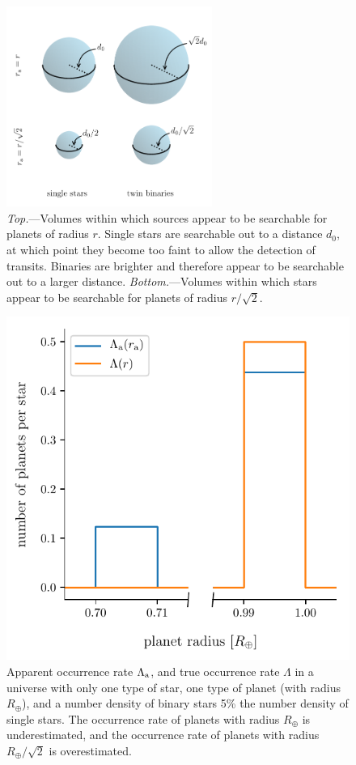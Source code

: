\documentclass[12pt,modern]{aastex61}
\renewcommand{\a}{_{\rm a}}
\begin{document}
\begin{figure}[!tb]
    \begin{center}
        \includegraphics[width=0.6\textwidth]{figures/visualize_volumes.pdf}
    \end{center}
    \caption{ {\it Top.}---Volumes within which sources appear to be
      searchable for planets of radius $r$.  Single stars are
      searchable out to a distance $d_0$, at which point they become
      too faint to allow the detection of transits.  Binaries
      are brighter and therefore appear to be searchable out to a
      larger distance.  {\it Bottom.}---Volumes within
      which stars appear to be searchable for planets of radius
      $r/\sqrt{2}$.  }
    \label{fig:model_1_volumes}
\end{figure}

\begin{figure}[!tb]
    \begin{center}
        \includegraphics[width=.6\textwidth]{figures/occ_rate_vs_radius_model_1_brokenx.pdf}
    \end{center}
    \vspace{-0.5cm}
    \caption{ Apparent occurrence rate $\Lambda\a$, and true
    occurrence rate $\Lambda$ in a universe with only one type of
    star, one type of planet (with radius $R_\oplus$), and a number
    density of binary stars 5\% the number density of single stars.
    The occurrence
    rate of planets with radius $R_\oplus$ is underestimated, and the
    occurrence rate of planets with radius
    $R_\oplus/\sqrt{2}$ is overestimated.}
    \label{fig:occ_rate_model_1}
\end{figure}
\end{document}
